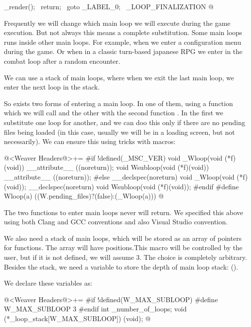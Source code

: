  _render();                                               \
  return;                                                  \
  goto _LABEL_0;                                           \
_LOOP_FINALIZATION
@
\fimcodigo


Frequently we will change which main loop we will execute during the
game execution. But not always this means a complete
substitution. Some main loops runs inside other main loops. For
example, when we enter a configuration menu during the game. Or when
in a classic turn-based japanese RPG we enter in the combat loop after
a random encounter.

We can use a stack of main loops, where when we exit the last main
loop, we enter the next loop in the stack.

So exists two forms of entering a main loop. In one of them, using a
function which we will call  and the other with the
second function . In the first we substitute one
loop for another, and we can doo this only if there are no pending
files being loaded (in this case, usually we will be in a loading
screen, but not necessarily). We can ensure this using tricks with
macros:

\iniciocodigo
@<Weaver Headers@>+=
#if !defined(_MSC_VER)
void _Wloop(void (*f)(void)) __attribute__ ((noreturn));
void Wsubloop(void (*f)(void)) __attribute__ ((noreturn));
#else
__declspec(noreturn) void _Wloop(void (*f)(void));
__declspec(noreturn) void Wsubloop(void (*f)(void));
#endif
#define Wloop(a) ((W.pending_files)?(false):(_Wloop(a)))
@
\fimcodigo

The two functions to enter main loops never will return. We specified
this above using both Clang and GCC conventions and also Visual Studio
convention.

We also need a stack of main loops, which will be stored as an array
of pointers for functions. The array will
have  positions.This macro will be
controlled by the user, but if it is not defined, we will assume
3. The choice is completely arbitrary. Besides the stack, we need a
variable to store the depth of main loop stack:
(\monoespaco{\_number\_of\_loops}).

We declare these variables as:

\iniciocodigo
@<Weaver Headers@>+=
#if !defined(W_MAX_SUBLOOP)
#define W_MAX_SUBLOOP 3
#endif
int _number_of_loops;
void (*_loop_stack[W_MAX_SUBLOOP]) (void);
@
\fimcodigo

